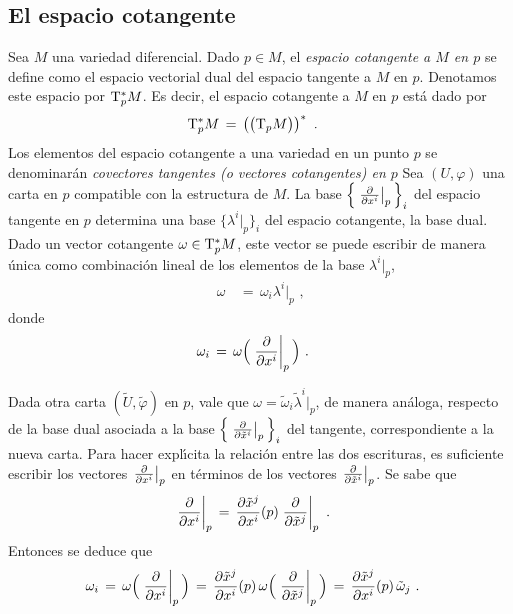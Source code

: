 \theoremstyle{plain}

\theoremstyle{remark}


\subsection{El espacio cotangente}
Sea $M$ una variedad diferencial. Dado $p\in M$, el
\emph{espacio cotangente a $M$ en $p$} se define como el espacio vectorial
dual del espacio tangente a $M$ en $p$. Denotamos este espacio por
$\tangente*[p]{M}$. Es decir, el espacio cotangente a $M$ en $p$ est\'{a}
dado por
\begin{align*}
	\tangente*[p]{M} & \,=\,\dual{\big(\tangente[p]{M}\big)}
	\text{ .}
\end{align*}
%
Los elementos del espacio cotangente a una variedad en un punto $p$
se denominar\'{a}n \emph{covectores tangentes (o vectores cotangentes) en %
$p$}
Sea $(U,\varphi)$ una carta en $p$ compatible con la estructura de $M$.
La base $\Big\{\gancho[p]{x^{i}}\Big\}_{i}$ del espacio tangente en $p$
determina una base $\{\lambda^{i}|_{p}\}_{i}$ del espacio cotangente,
la base dual. Dado un vector cotangente $\omega\in\tangente*[p]{M}$,
este vector se puede escribir de manera \'{u}nica como combinaci\'{o}n
lineal de los elementos de la base $\lambda^{i}|_{p}$,
\begin{align*}
	\omega & \,=\,\omega_{i}\lambda^{i}|_{p}
	\text{ ,}
\end{align*}
%
donde
\begin{align*}
	\omega_{i} & \,=\, \omega\Big(\gancho[p]{x^{i}}\Big)
	\text{ .}
\end{align*}
%

Dada otra carta $(\tilde{U},\tilde{\varphi})$ en $p$, vale que
$\omega=\tilde{\omega}_{i}\tilde{\lambda}^{i}|_{p}$, de manera
an\'{a}loga, respecto de la base dual asociada a la base
$\Big\{\gancho[p]{\tilde{x}^{i}}\Big\}_{i}$ del tangente, correspondiente
a la nueva carta. Para hacer expl\'{\i}cita la relaci\'{o}n entre las
dos escrituras, es suficiente escribir los vectores $\gancho[p]{x^{i}}$
en t\'{e}rminos de los vectores $\gancho[p]{\tilde{x}^{i}}$. Se sabe que
\begin{align*}
	\gancho[p]{x^{i}} & \,=\,\derivada{\tilde{x}^{j}}{x^{i}}(p)
		\gancho[p]{\tilde{x}^{j}}
	\text{ .}
\end{align*}
%
Entonces se deduce que
\begin{align*}
	\omega_{i} & \,=\,\omega\Big(\gancho[p]{x^{i}}\Big)
		\,=\,\derivada{\tilde{x}^{j}}{x^{i}}(p)\,
			\omega\Big(\gancho[p]{\tilde{x}^{j}}\Big)
		\,=\,\derivada{\tilde{x}^{j}}{x^{i}}(p)\,\tilde{\omega}_{j}
	\text{ .}
\end{align*}
%

